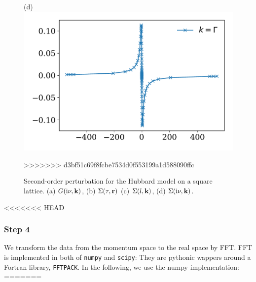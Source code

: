 \documentclass[submission, LectureNotes]{SciPost}
\newcommand{\bk}{\ensuremath{{\bf k}}}
\newcommand{\br}{\ensuremath{{\bf r}}}
\newcommand\ii{\mathrm{i}}%
\newcommand\iv{\ii\nu}%
\begin{document}
\begin{figure}
\begin{minipage}{0.5\columnwidth}
    \end{minipage}
    \begin{minipage}{0.5\columnwidth}
        \centering
        (d)
        \includegraphics[width=\columnwidth]{second_order_sigma_iv.pdf}
    \end{minipage}
%
%
%
>>>>>>> d3bf51c69f8fcbe7534d0f553199a1d588090ffc

    \caption{
        Second-order perturbation for the Hubbard model on a square lattice.
        (a) $G(\iv, \bk)$,
        (b) $\Sigma(\tau, \br)$
        (c) $\Sigma(l, \bk)$,
        (d) $\Sigma(\iv, \bk)$.
    }
    \label{fig:second_order_result}
\end{figure}


<<<<<<< HEAD
\subsubsection{Step 4}
We transform the data from the momentum space to the real space by FFT.
FFT is implemented in both of \texttt{numpy} and \texttt{scipy}:
They are pythonic wappers around a Fortran library, \texttt{FFTPACK}.
In the following, we use the numpy implementation:
=======
\end{document}
